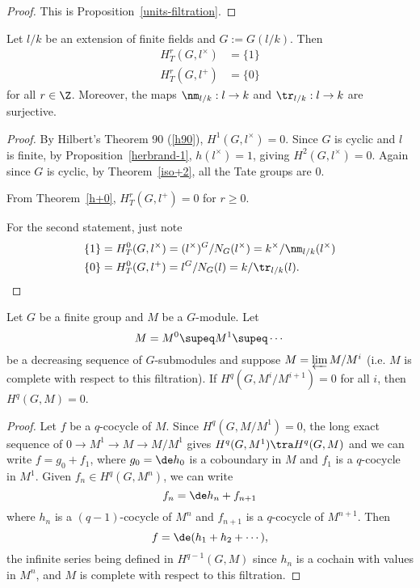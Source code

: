 \begin{proof}
This is Proposition~\ref{units-filtration}.
\end{proof}
\begin{pr}
Let $l/k$ be an extension of finite fields and $G:=G(l/k)$. Then
\begin{align*}
H_T^r(G,l^{\times})&=\{1\}\\
H_T^r(G,l^{+})&=\{0\}
\end{align*}
for all $r\in \Z$. Moreover, the maps $\nm_{l/k}:l\to k$ and $\tr_{l/k}:l\to k$ are surjective.
\end{pr}
\begin{proof}
By Hilbert's Theorem 90 (\ref{h90}), $H^1(G,l^{\times})=0$. Since $G$ is cyclic and $l$ is finite, by Proposition~\ref{herbrand-1}, $h(l^{\times})=1$, giving $H^2(G,l^{\times})=0$. Again since $G$ is cyclic, by Theorem~\ref{iso+2}, all the Tate groups are 0.

From Theorem~\ref{h+0}, $H_T^r(G,l^+)=0$ for $r\ge 0$. %

For the second statement, just note
\begin{align*}
\{1\}&=H_T^0(G,l^{\times})=(l^{\times})^G/N_G(l^{\times})
=k^{\times}/\nm_{l/k}(l^{\times})\\
\{0\}&=H_T^0(G,l^{+})=l^G/N_G(l)
=k/\tr_{l/k}(l).\qedhere
\end{align*}
\end{proof}
\begin{lem}
Let $G$ be a finite group and $M$ be a $G$-module. Let
\[
M=M^0\supeq M^1\supeq\cdots 
\]
be a decreasing sequence of $G$-submodules and suppose $M=\varprojlim M/M^i$ (i.e. $M$ is complete with respect to this filtration). If $H^q(G,M^i/M^{i+1})=0$ for all $i$, then $H^q(G,M)=0$.
\end{lem}
\begin{proof}
Let $f$ be a $q$-cocycle of $M$. 
Since $H^q(G,M/M^1)=0$, the long exact sequence of $0\to M^1\to M\to M/M^1$ gives $H^q(G,M^1)\tra H^q(G,M)$ and we can write $f=g_0+f_1$, where $g_0=\de h_0$ is a coboundary in $M$ and $f_1$ is a $q$-cocycle in $M^1$. Given $f_n\in H^q(G,M^n)$, we can write
\[
f_n=\de h_{n}+f_{n+1}
\] 
where $h_{n}$ is a $(q-1)$-cocycle of $M^n$ and $f_{n+1}$ is a $q$-cocycle of $M^{n+1}$. Then
\[
f=\de(h_1+h_2+\cdots ),
\]
the infinite series being defined in $H^{q-1}(G,M)$ since $h_n$ is a cochain with values in $M^n$, and $M$ is complete with respect to this filtration.
\end{proof}
